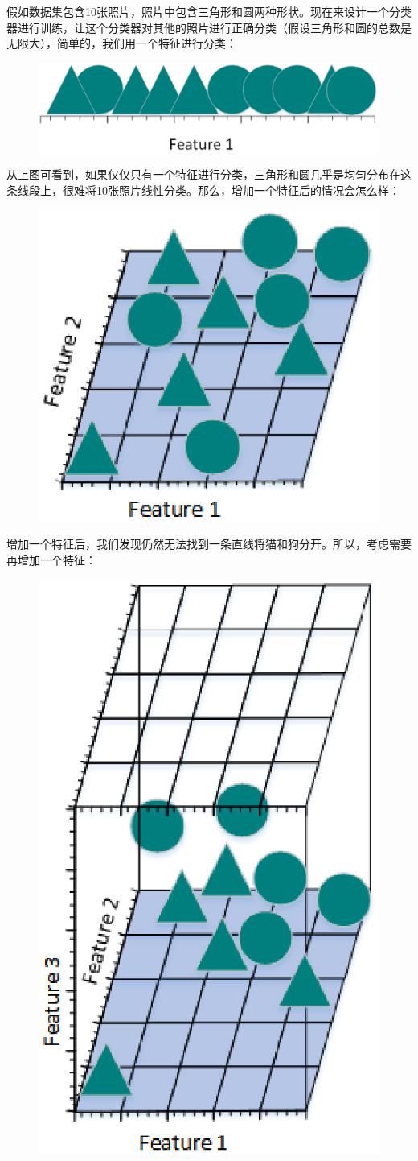 假如数据集包含10张照片，照片中包含三角形和圆两种形状。现在来设计一个分类器进行训练，让这个分类器对其他的照片进行正确分类（假设三角形和圆的总数是无限大），简单的，我们用一个特征进行分类：

 \begin{figure}[h]
   \centering
   \includegraphics[width=.7\textwidth]{imgs/2.21.1.1.eps}
 \end{figure} %

从上图可看到，如果仅仅只有一个特征进行分类，三角形和圆几乎是均匀分布在这条线段上，很难将10张照片线性分类。那么，增加一个特征后的情况会怎么样：

 \begin{figure}[h]
   \centering
   \includegraphics[width=.5\textwidth]{imgs/2.21.1.2.eps}
 \end{figure}

增加一个特征后，我们发现仍然无法找到一条直线将猫和狗分开。所以，考虑需要再增加一个特征：

 \begin{figure}[h]
   \centering
   \includegraphics[width=.5\textwidth]{imgs/2.21.1.3.eps}
 \end{figure}

